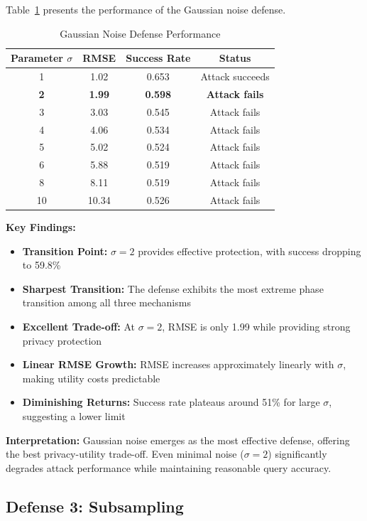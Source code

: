 \documentclass[11pt,letterpaper]{article}
\begin{document}
Table~\ref{tab:noise} presents the performance of the Gaussian noise defense.

\begin{table}[H]
\centering
\caption{Gaussian Noise Defense Performance}
\label{tab:noise}
\begin{tabular}{@{}cccc@{}}
\toprule
\textbf{Parameter $\sigma$} & \textbf{RMSE} & \textbf{Success Rate} & \textbf{Status} \\ \midrule
1 & 1.02 & 0.653 & Attack succeeds \\
\textbf{2} & \textbf{1.99} & \textbf{0.598} & \textbf{Attack fails} \\
3 & 3.03 & 0.545 & Attack fails \\
4 & 4.06 & 0.534 & Attack fails \\
5 & 5.02 & 0.524 & Attack fails \\
6 & 5.88 & 0.519 & Attack fails \\
8 & 8.11 & 0.519 & Attack fails \\
10 & 10.34 & 0.526 & Attack fails \\ \bottomrule
\end{tabular}
\end{table}

\textbf{Key Findings:}

\begin{itemize}[leftmargin=*]
    \item \textbf{Transition Point:} $\sigma = 2$ provides effective protection, with success dropping to 59.8\%
    \item \textbf{Sharpest Transition:} The defense exhibits the most extreme phase transition among all three mechanisms
    \item \textbf{Excellent Trade-off:} At $\sigma = 2$, RMSE is only 1.99 while providing strong privacy protection
    \item \textbf{Linear RMSE Growth:} RMSE increases approximately linearly with $\sigma$, making utility costs predictable
    \item \textbf{Diminishing Returns:} Success rate plateaus around 51\% for large $\sigma$, suggesting a lower limit
\end{itemize}

\textbf{Interpretation:} Gaussian noise emerges as the most effective defense, offering the best privacy-utility trade-off. Even minimal noise ($\sigma = 2$) significantly degrades attack performance while maintaining reasonable query accuracy.

\subsection{Defense 3: Subsampling}
\end{document}
